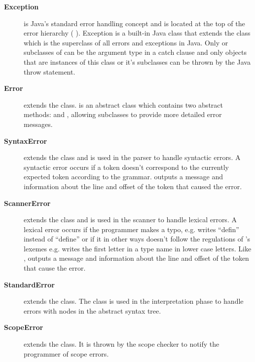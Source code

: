 \begin{description}
\item[\textbf{Exception}] is Java's standard error handling concept and is located 
  at the top of the error hierarchy (
  ). Exception is a built-in Java class that
  extends the  class which is the superclass of all errors
  and exceptions in Java. Only  or subclasses of
   can be the argument type in a catch clause and only
  objects that are instances of this class or it's subclasses can be thrown by
  the Java throw statement.
  \cite{throwable}

\item[\textbf{Error}] extends the  class.
   is an abstract class which contains two abstract
  methods:  and , allowing
  subclasses to provide more detailed error messages.

\item[\textbf{SyntaxError}] extends the  class and is used in
  the parser to handle syntactic errors. A syntactic error occurs if a token
  doesn't correspond to the currently expected token according to the grammar.
   outputs a message and information about the line and
  offset of the token that caused the error. 

\item[\textbf{ScannerError}] extends the  class and is
  used in the scanner to handle lexical errors. A lexical error occurs if the
  programmer makes a typo, e.g. writes ``defin'' instead of ``define'' or if it 
  in other ways doesn't follow the regulations of \productname{}'s lexemes e.g.
  writes the first letter in a type name in lower case letters. Like
  ,  outputs a message and
  information about the line and offset of the token that cause the error.  

\item[\textbf{StandardError}] extends the  class. The
   class is used in the interpretation phase to handle
  errors with nodes in the abstract syntax tree.  

\item[\textbf{ScopeError}] extends the  class. It is
  thrown by the scope checker to notify the programmer of scope errors.


\end{description}

